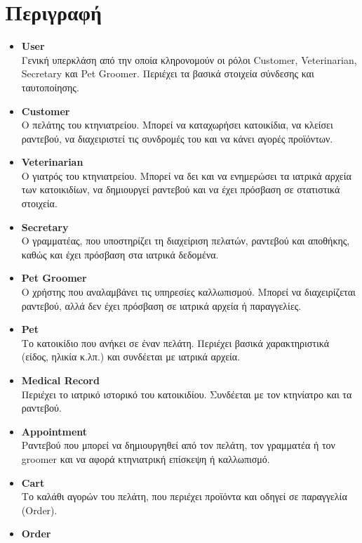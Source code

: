 \documentclass[12pt,a4paper,twoside]{book}
\begin{document}
\section{Περιγραφή}
\begin{itemize}
    \item \textbf{User}\\
          Γενική υπερκλάση από την οποία κληρονομούν οι ρόλοι Customer, Veterinarian, Secretary και Pet Groomer. Περιέχει τα βασικά στοιχεία σύνδεσης και ταυτοποίησης. %
    \item \textbf{Customer}\\
          Ο πελάτης του κτηνιατρείου. Μπορεί να καταχωρήσει κατοικίδια, να κλείσει ραντεβού, να διαχειριστεί τις συνδρομές του και να κάνει αγορές προϊόντων. %
    \item \textbf{Veterinarian}\\
          Ο γιατρός του κτηνιατρείου. Μπορεί να δει και να ενημερώσει τα ιατρικά αρχεία των κατοικιδίων, να δημιουργεί ραντεβού και να έχει πρόσβαση σε στατιστικά στοιχεία. %
    \item \textbf{Secretary}\\
          Ο γραμματέας, που υποστηρίζει τη διαχείριση πελατών, ραντεβού και αποθήκης, καθώς και έχει πρόσβαση στα ιατρικά δεδομένα. %
    \item \textbf{Pet Groomer}\\
          Ο χρήστης που αναλαμβάνει τις υπηρεσίες καλλωπισμού. Μπορεί να διαχειρίζεται ραντεβού, αλλά δεν έχει πρόσβαση σε ιατρικά αρχεία ή παραγγελίες. %
    \item \textbf{Pet}\\
          Το κατοικίδιο που ανήκει σε έναν πελάτη. Περιέχει βασικά χαρακτηριστικά (είδος, ηλικία κ.λπ.) και συνδέεται με ιατρικά αρχεία. %
    \item \textbf{Medical Record}\\
          Περιέχει το ιατρικό ιστορικό του κατοικιδίου. Συνδέεται με τον κτηνίατρο και τα ραντεβού. %
    \item \textbf{Appointment}\\
          Ραντεβού που μπορεί να δημιουργηθεί από τον πελάτη, τον γραμματέα ή τον groomer και να αφορά κτηνιατρική επίσκεψη ή καλλωπισμό. %
    \item \textbf{Cart}\\
          Το καλάθι αγορών του πελάτη, που περιέχει προϊόντα και οδηγεί σε παραγγελία (Order). %
    \item \textbf{Order}\\

\end{itemize}
\end{document}
